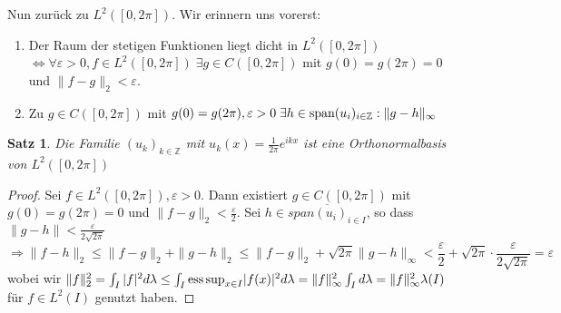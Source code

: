\documentclass[ngerman]{report}
\theoremstyle{plain}%
\newtheorem{thm}{Satz}[chapter]
\theoremstyle{definition}%
\theoremstyle{myStyle}
\newcommand{\Z}{\mathbb{Z}}
\newcommand{\ess}{\textnormal{ess}}
\newcommand{\aufspan}{\textnormal{span}}
\newcommand{\norm}[1]{\|#1\|}
\newcommand{\df}[1][]{%
	\overset{#1}{\Rightarrow}
}
\newcommand{\ff}[3]{(#1_#2)_{#2\in#3}}
\begin{document}

	Nun zurück zu $L^2([0,2\pi]).$
	Wir erinnern uns vorerst:	 
			\begin{enumerate}
				\item Der Raum der stetigen Funktionen liegt dicht in $L^2([0,2\pi])$\\
				 $\Leftrightarrow \forall \varepsilon > 0, f\in L^2([0,2\pi])\; \exists g\in C([0,2\pi])$ mit 
				$g(0) = g(2\pi) = 0$ und $\norm{f-g}_2 < \varepsilon$.
				\item Zu $g\in C([0,2\pi])$ mit $g(0) = g(2\pi), \varepsilon > 0 \;\exists h\in \aufspan\ff{u}{i}{\Z}: \norm{g-h}_\infty$
			\end{enumerate}
	\begin{thm} 
		Die Familie $\ff{u}{k}{\Z}$ mit $u_k(x) = \frac{1}{2 \pi} e^{ikx}$ ist eine Orthonormalbasis von $L^2([0,2\pi])$ 
		
	\end{thm}
	\begin{proof}
		Sei $f\in L^2([0,2\pi]), \varepsilon > 0$.
		Dann existiert $g\in C([0,2\pi])$ mit $g(0) = g(2\pi) = 0$ und $\norm{f-g}_2 < \frac{\varepsilon}{2}$.
		Sei $h\in \overline{span\ff{u}{i}{I}}$, so dass $\norm{g-h} < \frac{\varepsilon}{2\sqrt{2\pi}}$
		$$\df \norm{f-h}_2 \leq \norm{f-g}_2 + \norm{g-h}_2 \leq \norm{f-g}_2 + \sqrt{2\pi} \norm{g-h}_\infty < \frac{\varepsilon}{2} + \sqrt{2\pi} \cdot \frac{\varepsilon}{2\sqrt{2\pi}} = \varepsilon$$
		wobei wir $\|f\|^2_2 = \int_I |f|^2 d\lambda \leq \int_I {\ess \sup}_{x\in I} |f(x)|^2 d\lambda = \|f\|^2_\infty \int_I d\lambda = \|f\|^2_\infty \lambda(I)$ für $f\in L^2(I)$ genutzt haben.
	\end{proof}
\end{document}
